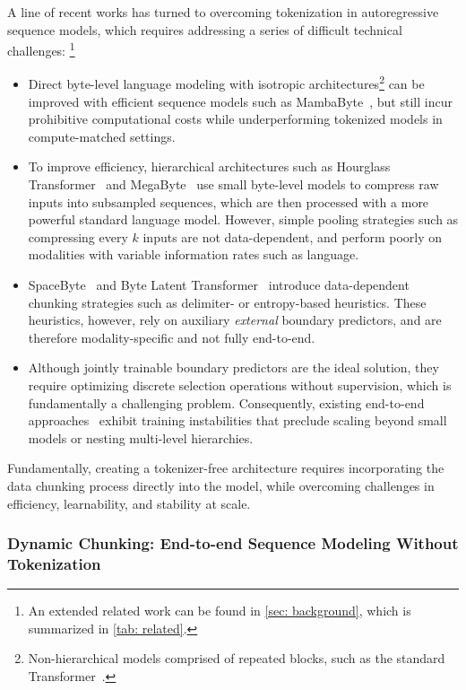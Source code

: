 A line of recent works has turned to overcoming tokenization in autoregressive sequence models, which requires addressing a series of difficult technical challenges:
\footnote{An extended related work can be found in \cref{sec: background}, which is summarized in \cref{tab: related}.}
\begin{itemize}
    \item Direct byte-level language modeling with isotropic architectures\footnote{Non-hierarchical models comprised of repeated blocks, such as the standard Transformer~\citep{Transformer}.} can be improved with efficient sequence models such as MambaByte~\citep{MambaByte}, 
    but still incur prohibitive computational costs while underperforming tokenized models in compute-matched settings.
    \item To improve efficiency, hierarchical architectures such as Hourglass Transformer~\citep{HourglassTransformer} and MegaByte~\citep{MegaByte} use small byte-level models to compress raw inputs into subsampled sequences, which are then processed with a more powerful standard language model. However, simple pooling strategies such as compressing every $k$ inputs are not data-dependent, and perform poorly on modalities with variable information rates such as language.
    \item SpaceByte~\citep{SpaceByte} and Byte Latent Transformer~\citep{BLT} introduce data-dependent chunking strategies such as delimiter- or entropy-based heuristics. These heuristics, however, rely on auxiliary \emph{external} boundary predictors, and are therefore modality-specific and not fully end-to-end.
    \item
    Although jointly trainable boundary predictors are the ideal solution, they require optimizing discrete selection operations without supervision, which is fundamentally a challenging problem.
    Consequently, existing end-to-end approaches~\citep{DPT} exhibit training instabilities that preclude scaling beyond small models or nesting multi-level hierarchies.
\end{itemize}
Fundamentally, creating a tokenizer-free architecture requires incorporating the data chunking process directly into the model, while overcoming challenges in efficiency, learnability, and stability at scale.

\subsubsection*{Dynamic Chunking: End-to-end Sequence Modeling Without Tokenization}

